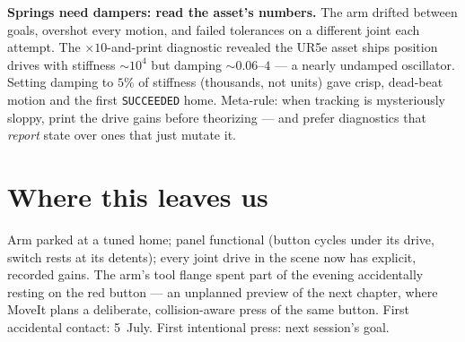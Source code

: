 \begin{lesson}
\textbf{Springs need dampers: read the asset's numbers.} The arm drifted between goals,
overshot every motion, and failed tolerances on a different joint each attempt. The
$\times10$-and-print diagnostic revealed the UR5e asset ships position drives with stiffness
$\sim10^4$ but damping $\sim0.06$--$4$ --- a nearly undamped oscillator. Setting damping to
$5\%$ of stiffness (thousands, not units) gave crisp, dead-beat motion and the first
\texttt{SUCCEEDED} home. Meta-rule: when tracking is mysteriously sloppy, print the drive
gains before theorizing --- and prefer diagnostics that \emph{report} state over ones that
just mutate it.
\end{lesson}

\section{Where this leaves us}

Arm parked at a tuned home; panel functional (button cycles under its drive, switch rests at
its detents); every joint drive in the scene now has explicit, recorded gains. The arm's tool
flange spent part of the evening accidentally resting on the red button --- an unplanned
preview of the next chapter, where MoveIt plans a deliberate, collision-aware press of the
same button. First accidental contact: 5~July. First intentional press: next session's goal.
